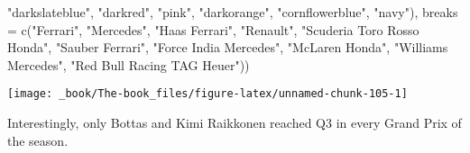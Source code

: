 \documentclass[
]{book}
\newenvironment{Shaded}{\begin{snugshade}}{\end{snugshade}}
\newcommand{\AttributeTok}[1]{\textcolor[rgb]{0.77,0.63,0.00}{#1}}
\newcommand{\FunctionTok}[1]{\textcolor[rgb]{0.00,0.00,0.00}{#1}}
\newcommand{\NormalTok}[1]{#1}
\newcommand{\StringTok}[1]{\textcolor[rgb]{0.31,0.60,0.02}{#1}}
\begin{document}
\begin{Shaded}
\begin{Highlighting}[]
                               \StringTok{"darkslateblue"}\NormalTok{, }
                                \StringTok{"darkred"}\NormalTok{,  }
                                \StringTok{"pink"}\NormalTok{, }
                                \StringTok{"darkorange"}\NormalTok{, }
                                \StringTok{"cornflowerblue"}\NormalTok{,}
                               \StringTok{"navy"}\NormalTok{),}
                     \AttributeTok{breaks =} \FunctionTok{c}\NormalTok{(}\StringTok{"Ferrari"}\NormalTok{,}
                                 \StringTok{"Mercedes"}\NormalTok{,}
                                 \StringTok{"Haas Ferrari"}\NormalTok{,}
                                 \StringTok{"Renault"}\NormalTok{,}
                                 \StringTok{"Scuderia Toro Rosso Honda"}\NormalTok{,}
                                 \StringTok{"Sauber Ferrari"}\NormalTok{, }
                                 \StringTok{"Force India Mercedes"}\NormalTok{,}
                                 \StringTok{"McLaren Honda"}\NormalTok{,}
                                 \StringTok{"Williams Mercedes"}\NormalTok{,}
                                 \StringTok{"Red Bull Racing TAG Heuer"}\NormalTok{))}
\end{Highlighting}
\end{Shaded}

\begin{center}\texttt{[image: \_book/The-book\_files/figure-latex/unnamed-chunk-105-1]} \end{center}

Interestingly, only Bottas and Kimi Raikkonen reached Q3 in every Grand Prix of the season.
\end{document}
